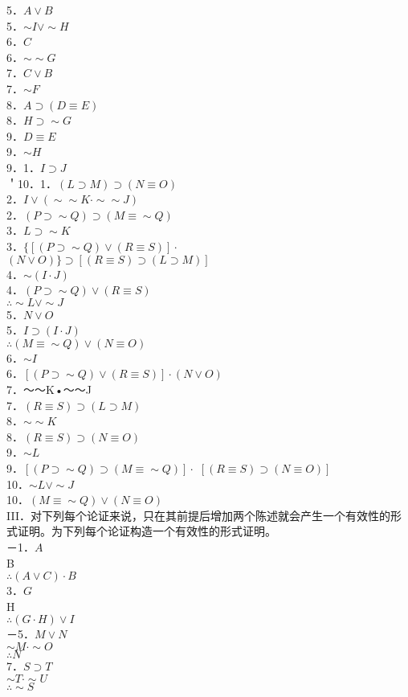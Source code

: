 5．$A \vee B$\\
5．$\sim I \vee \sim H$\\
6．$C$\\
6．$\sim \sim G$\\
7．$C \vee B$\\
7．$\sim F$\\
8．$A \supset(D \equiv E)$\\
8．$H \supset \sim G$\\
9．$D \equiv E$\\
9．$\sim H$\\
9．1．$I \supset J$\\
＇10．1．$(L \supset M) \supset(N \equiv O)$\\
2．$I \vee(\sim \sim K \cdot \sim \sim J)$\\
2．$(P \supset \sim Q) \supset(M \equiv \sim Q)$\\
3．$L \supset \sim K$\\
3．$\{[(P \supset \sim Q) \vee(R \equiv S)] \cdot$\\
$(N \vee O)\} \supset[(R \equiv S) \supset(L \supset M)]$\\
4．$\sim(I \cdot J)$\\
4．$(P \supset \sim Q) \vee(R \equiv S)$\\
$\therefore \sim L \vee \sim J$\\
5．$N \vee O$\\
5．$I \supset(I \cdot J)$\\
$\therefore(M \equiv \sim Q) \vee(N \equiv O)$\\
6．$\sim I$\\
6．$[(P \supset \sim Q) \vee(R \equiv S)] \cdot(N \vee O)$\\
7．～～K•～～J\\
7．$(R \equiv S) \supset(L \supset M)$\\
8．$\sim \sim K$\\
8．$(R \equiv S) \supset(N \equiv O)$\\
9．$\sim L$\\
9．$[(P \supset \sim Q) \supset(M \equiv \sim Q)] \cdot$ $[(R \equiv S) \supset(N \equiv O)]$\\
10．$\sim L \vee \sim J$\\
10．$(M \equiv \sim Q) \vee(N \equiv O)$\\
III．对下列每个论证来说，只在其前提后增加两个陈述就会产生一个有效性的形式证明。为下列每个论证构造一个有效性的形式证明。\\
－1．$A$\\
B\\
$\therefore(A \vee C) \cdot B$\\
3．$G$\\
H\\
$\therefore(G \cdot H) \vee I$\\
－5．$M \vee N$\\
$\sim M \cdot \sim O$\\
$\therefore N$\\
7．$S \supset T$\\
$\sim T \cdot \sim U$\\
$\therefore \sim S$

